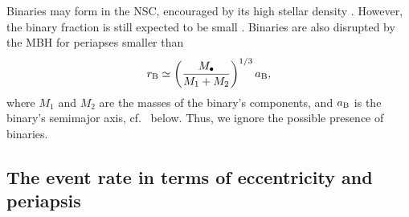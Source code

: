 Binaries may form in the NSC, encouraged by its high stellar density \citep{O'Leary2009}. However, the binary fraction is still expected to be small \citep{Hopman2009}. Binaries are also disrupted by the MBH for periapses smaller than
\begin{equation}
r_\mathrm{B} \simeq \left(\dfrac{M_\bullet}{M_1 + M_2}\right)^{1/3}a_\mathrm{B},
\end{equation}
where $M_1$ and $M_2$ are the masses of the binary's components, and $a_\mathrm{B}$ is the binary's semimajor axis, cf.\  below. Thus, we ignore the possible presence of binaries.

\subsection{The event rate in terms of eccentricity and periapsis}\label{sec:e-rp}

